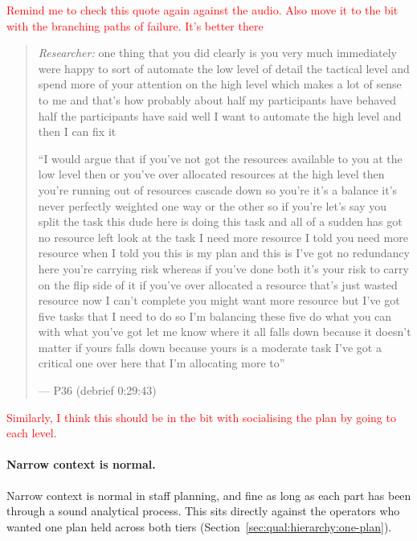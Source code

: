 \textcolor{red}{Remind me to check this quote again against the audio. Also move it to the bit with the branching paths of failure. It's better there}
\begin{quote}\small
{\footnotesize\textit{Researcher:} one thing that you did clearly is you very much immediately were happy to sort of automate the low level of detail the tactical level and spend more of your attention on the high level which makes a lot of sense to me and that's how probably about half my participants have behaved half the participants have said well I want to automate the high level and then I can fix it}\par\smallskip
``I would argue that if you've not got the resources available to you at the low level then or you've over allocated resources at the high level then you're running out of resources cascade down so you're it's a balance it's never perfectly weighted one way or the other so if you're let's say you split the task this dude here is doing this task and all of a sudden has got no resource left look at the task I need more resource I told you need more resource when I told you this is my plan and this is I've got no redundancy here you're carrying risk whereas if you've done both it's your risk to carry on the flip side of it if you've over allocated a resource that's just wasted resource now I can't complete you might want more resource but I've got five tasks that I need to do so I'm balancing these five do what you can with what you've got let me know where it all falls down because it doesn't matter if yours falls down because yours is a moderate task I've got a critical one over here that I'm allocating more to''\par\hfill--- P36 (debrief 0:29:43)
\end{quote}


\textcolor{red}{Similarly, I think this should be in the bit with socialising the plan by going to each level.}
\label{sec:qual:practitioner:pt-silos}\paragraph{Narrow context is normal.}
Narrow context is normal in staff planning, and fine as long as each part has been through a sound analytical process. This sits directly against the operators who wanted one plan held across both tiers (Section~\ref{sec:qual:hierarchy:one-plan}).

